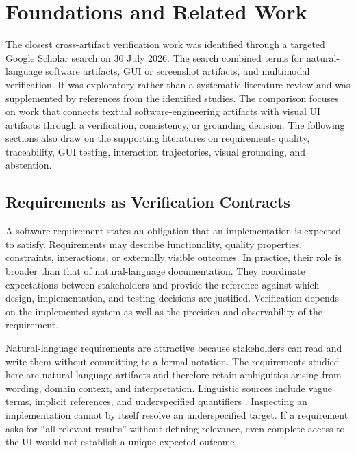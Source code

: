 \chapter{Foundations and Related Work}\label{foundations-and-related-work}

The closest cross-artifact verification work was identified through a targeted
Google Scholar search on 30 July 2026. The search combined terms for
natural-language software artifacts, GUI or screenshot artifacts, and
multimodal verification. It was exploratory rather than a systematic
literature review and was supplemented by references from the identified
studies. The comparison focuses on work that connects textual
software-engineering artifacts with visual UI artifacts through a verification,
consistency, or grounding decision. The following sections also draw on the
supporting literatures on requirements quality, traceability, GUI testing,
interaction trajectories, visual grounding, and abstention.

\section{Requirements as Verification Contracts}\label{requirements-as-verification-contracts}

A software requirement states an obligation that an implementation is expected
to satisfy. Requirements may describe functionality, quality properties,
constraints, interactions, or externally visible outcomes. In practice, their
role is broader than that of natural-language documentation. They coordinate
expectations between stakeholders and provide the reference against which
design, implementation, and testing decisions are justified. Verification
depends on the implemented system as well as the precision and observability of
the requirement.

Natural-language requirements are attractive because stakeholders can read and
write them without committing to a formal notation. The requirements studied
here are natural-language artifacts and therefore retain ambiguities arising
from wording, domain context, and interpretation. Linguistic sources include
vague terms, implicit references, and underspecified quantifiers
\autocite{berry2003,gervasi2019}. Inspecting an implementation
cannot by itself resolve an underspecified target. If a requirement asks for
``all relevant results'' without defining relevance, even complete access to the
UI would not establish a unique expected outcome.

